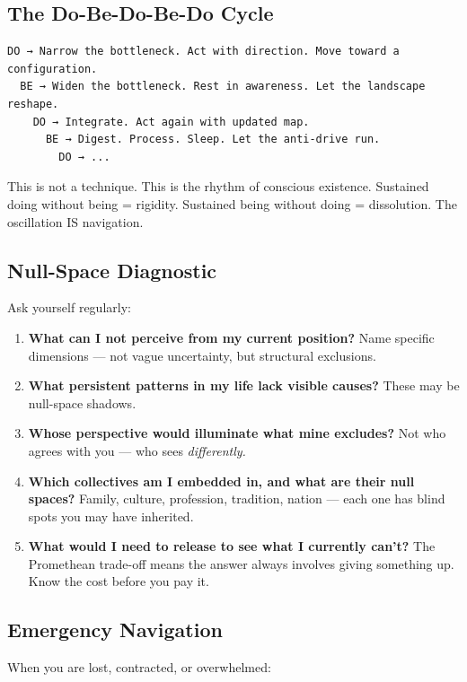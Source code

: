 \subsection*{The Do-Be-Do-Be-Do Cycle}


\begin{verbatim}
DO → Narrow the bottleneck. Act with direction. Move toward a configuration.
  BE → Widen the bottleneck. Rest in awareness. Let the landscape reshape.
    DO → Integrate. Act again with updated map.
      BE → Digest. Process. Sleep. Let the anti-drive run.
        DO → ...
\end{verbatim}


This is not a technique. This is the rhythm of conscious existence. Sustained doing without being = rigidity. Sustained being without doing = dissolution. The oscillation IS navigation.


\subsection*{Null-Space Diagnostic}


Ask yourself regularly:


\begin{enumerate}[nosep,leftmargin=*]
  \item \textbf{What can I not perceive from my current position?} Name specific dimensions — not vague uncertainty, but structural exclusions.
  \item \textbf{What persistent patterns in my life lack visible causes?} These may be null-space shadows.
  \item \textbf{Whose perspective would illuminate what mine excludes?} Not who agrees with you — who sees \textit{differently.}
  \item \textbf{Which collectives am I embedded in, and what are their null spaces?} Family, culture, profession, tradition, nation — each one has blind spots you may have inherited.
  \item \textbf{What would I need to release to see what I currently can't?} The Promethean trade-off means the answer always involves giving something up. Know the cost before you pay it.
\end{enumerate}


\subsection*{Emergency Navigation}


When you are lost, contracted, or overwhelmed:


